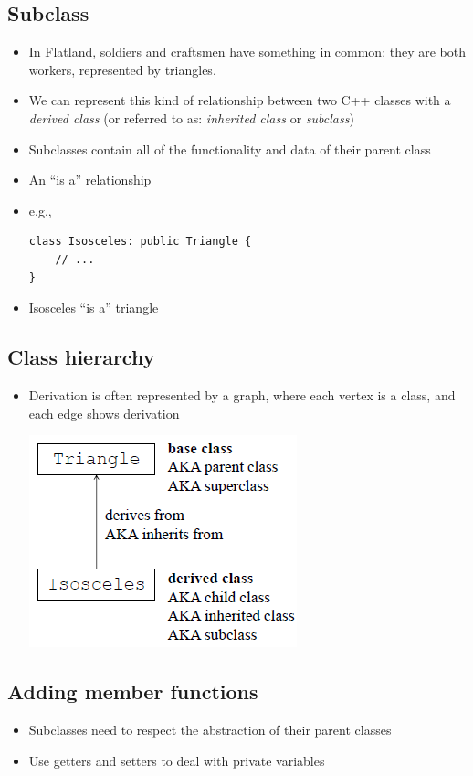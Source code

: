 \subsection{Subclass}
\begin{itemize}
	\item In Flatland, soldiers and craftsmen have something in common: they are both workers, represented by triangles.
	\item We can represent this kind of relationship between two C++ classes with a \textit{derived class} (or referred to as: \textit{inherited class} or \textit{subclass})
	\item Subclasses contain all of the functionality and data of their parent class
	\item An ``is a'' relationship
	\item e.g.,
\begin{lstlisting}[style=C++]
class Isosceles: public Triangle {
	// ...
}
\end{lstlisting}
	\item Isosceles ``is a'' triangle
\end{itemize}

\subsection{Class hierarchy}
\begin{itemize}
	\item Derivation is often represented by a graph, where each vertex is a class, and each edge shows derivation
	\begin{center}
		\includegraphics{sections/lec11/hi.png}
	\end{center}
\end{itemize}

\subsection{Adding member functions}
\begin{itemize}
	\item Subclasses need to respect the abstraction of their parent classes
	\item Use getters and setters to deal with private variables
\end{itemize}

